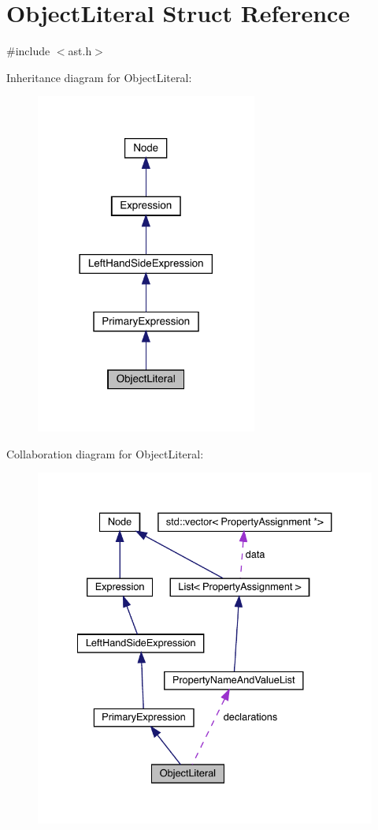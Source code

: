 \hypertarget{struct_object_literal}{}\section{Object\+Literal Struct Reference}
\label{struct_object_literal}


{\ttfamily \#include $<$ast.\+h$>$}



Inheritance diagram for Object\+Literal\+:
\nopagebreak
\begin{figure}[H]
\begin{center}
\leavevmode
\includegraphics[width=206pt]{struct_object_literal__inherit__graph}
\end{center}
\end{figure}


Collaboration diagram for Object\+Literal\+:
\nopagebreak
\begin{figure}[H]
\begin{center}
\leavevmode
\includegraphics[width=334pt]{struct_object_literal__coll__graph}
\end{center}
\end{figure}
